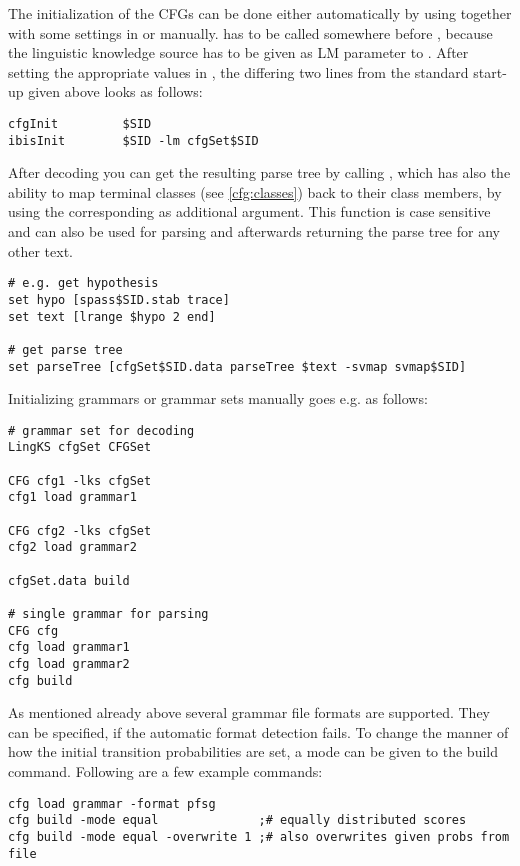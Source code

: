 The initialization of the CFGs can be done either automatically by
using  together with some settings in
 or manually.  has to be
called somewhere before , because the linguistic
knowledge source has to be given as LM parameter to
. After setting the appropriate values in
, the differing two lines from the standard
start-up given above looks as follows:

\begin{verbatim}
cfgInit         $SID
ibisInit        $SID -lm cfgSet$SID
\end{verbatim}

After decoding you can get the resulting parse tree by calling
, which has also the ability to map terminal
classes (see \ref{cfg:classes}) back to their class members, by using
the corresponding  as additional argument. This
function is case sensitive and can also be used for parsing and
afterwards returning the parse tree for any other text.

\begin{verbatim}
# e.g. get hypothesis
set hypo [spass$SID.stab trace]
set text [lrange $hypo 2 end]

# get parse tree
set parseTree [cfgSet$SID.data parseTree $text -svmap svmap$SID]
\end{verbatim}

Initializing grammars or grammar sets manually goes e.g. as follows:

\begin{verbatim}
# grammar set for decoding
LingKS cfgSet CFGSet

CFG cfg1 -lks cfgSet
cfg1 load grammar1

CFG cfg2 -lks cfgSet
cfg2 load grammar2

cfgSet.data build

# single grammar for parsing
CFG cfg
cfg load grammar1
cfg load grammar2
cfg build
\end{verbatim}

As mentioned already above several grammar file formats are supported.
They can be specified, if the automatic format detection fails. To
change the manner of how the initial transition probabilities are set,
a mode can be given to the build command. Following are a few example
commands:

\begin{verbatim}
cfg load grammar -format pfsg
cfg build -mode equal              ;# equally distributed scores
cfg build -mode equal -overwrite 1 ;# also overwrites given probs from file
\end{verbatim}


